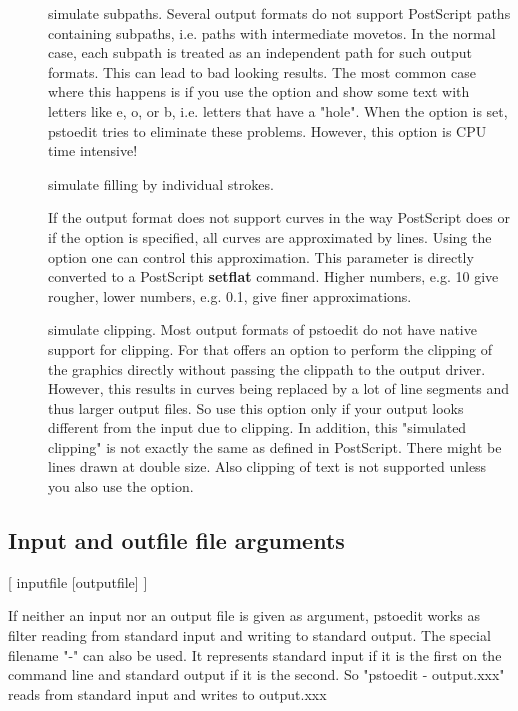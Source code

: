 \documentclass[english,a4paper]{article}
\begin{document}
\begin{description}
\item[]
simulate subpaths.
Several output formats do not support PostScript paths containing subpaths, i.e. paths with intermediate movetos. In the normal case, each subpath is treated as an independent path for such output formats. This can lead to bad looking results. The most common case where this happens is if you use the  option and show some text with letters like e, o, or b, i.e. letters that have a "hole". When the  option is set, pstoedit tries to eliminate these problems. However, this option is CPU time intensive!


\item[]
simulate filling by individual strokes.



\item[]
If the output format does not support curves in the way PostScript does or if the  option is specified, all curves are approximated by lines. Using the  option one can control this approximation. This parameter is directly converted to a PostScript \textbf{setflat} command. Higher numbers, e.g. 10 give rougher, lower numbers, e.g. 0.1, give finer approximations.


\item[]
simulate clipping.
Most output formats of pstoedit do not have native support for clipping. For that  offers an option to perform the clipping of the graphics directly without passing the clippath to the output driver. However, this results in curves being replaced by a lot of line segments and thus larger output files. So use this option only if your output looks different from the input due to clipping. In addition, this "simulated clipping" is not exactly the same as defined in PostScript. There might be lines drawn at double size. Also clipping of text is not supported unless you also use the  option.


\end{description}
\subsection{Input and outfile file arguments}
[ inputfile [outputfile] ]


If neither an input nor an output file is given as argument, pstoedit works as filter reading from standard input and
writing to standard output.
The special filename "-" can also be used. It represents standard input if it is the first on the command line and standard output if it is the second. So "pstoedit - output.xxx" reads from standard input and writes to output.xxx
\end{document}
